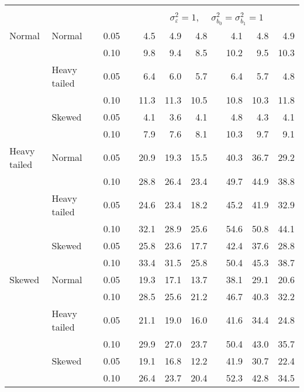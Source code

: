 \begin{table}[ht]
\begin{scriptsize}
\begin{center}
\begin{tabular}{ll p{.1cm} c p{.1cm} rrr p{.1cm} rrr}
&&&&&&&&&&&\\
& && && \multicolumn{7}{c}{$\sigma_{\varepsilon}^2 = 1$, \ \ $\sigma_{b_0}^2 = \sigma_{b_1}^2 = 1$} \\ \cline{6-12}
Normal       & Normal       && 0.05 &&   4.5 & 4.9 & 4.8 &   & 4.1 & 4.8 & 4.9 \\ 
             &              && 0.10 &&   9.8 & 9.4 & 8.5 &   & 10.2 & 9.5 & 10.3 \\ 
             & Heavy tailed && 0.05 &&   6.4 & 6.0 & 5.7 &   & 6.4 & 5.7 & 4.8 \\ 
             &              && 0.10 &&   11.3 & 11.3 & 10.5 &   & 10.8 & 10.3 & 11.8 \\ 
             & Skewed       && 0.05 &&   4.1 & 3.6 & 4.1 &   & 4.8 & 4.3 & 4.1 \\ 
             &              && 0.10 &&   7.9 & 7.6 & 8.1 &   & 10.3 & 9.7 & 9.1 \\ 
Heavy tailed & Normal       && 0.05 &&   20.9 & 19.3 & 15.5 &   & 40.3 & 36.7 & 29.2 \\ 
             &              && 0.10 &&   28.8 & 26.4 & 23.4 &   & 49.7 & 44.9 & 38.8 \\ 
             & Heavy tailed && 0.05 &&   24.6 & 23.4 & 18.2 &   & 45.2 & 41.9 & 32.9 \\ 
             &              && 0.10 &&   32.1 & 28.9 & 25.6 &   & 54.6 & 50.8 & 44.1 \\ 
             & Skewed       && 0.05 &&   25.8 & 23.6 & 17.7 &   & 42.4 & 37.6 & 28.8 \\ 
             &              && 0.10 &&   33.4 & 31.5 & 25.8 &   & 50.4 & 45.3 & 38.7 \\ 
Skewed       & Normal       && 0.05 &&   19.3 & 17.1 & 13.7 &   & 38.1 & 29.1 & 20.6 \\ 
             &              && 0.10 &&   28.5 & 25.6 & 21.2 &   & 46.7 & 40.3 & 32.2 \\ 
             & Heavy tailed && 0.05 &&   21.1 & 19.0 & 16.0 &   & 41.6 & 34.4 & 24.8 \\ 
             &              && 0.10 &&   29.9 & 27.0 & 23.7 &   & 50.4 & 43.0 & 35.7 \\ 
             & Skewed       && 0.05 &&   19.1 & 16.8 & 12.2 &   & 41.9 & 30.7 & 22.4 \\ 
             &              && 0.10 &&   26.4 & 23.7 & 20.4 &   & 52.3 & 42.8 & 34.5 \\ 


\end{tabular}
\end{center}
\end{scriptsize}
\end{table}
